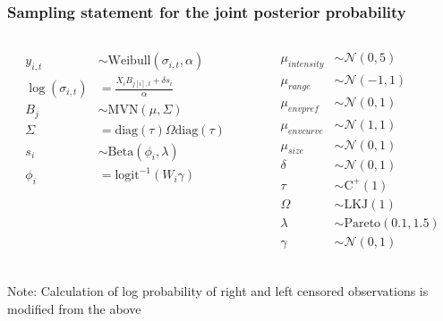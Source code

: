 \documentclass{beamer}
\begin{document}
\begin{frame}
  \frametitle{Sampling statement for the joint posterior probability}
  \begin{columns}
    \begin{column}{0.5\textwidth}
      \begin{align*}
        y_{i, t} &\sim \text{Weibull}(\sigma_{i, t}, \alpha) \\
        \log(\sigma_{i, t}) &= \frac{X_{i}B_{j[i], t} + \delta s_{i}}{\alpha} \\
        B_{j} &\sim \text{MVN}(\mu, \Sigma) \\
        \Sigma &= \text{diag}(\tau) \Omega \text{diag}(\tau) \\
        s_{i} &\sim \text{Beta}(\phi_{i}, \lambda) \\
        \phi_{i} &= \text{logit}^{-1}(W_{i}\gamma) \\
      \end{align*}
    \end{column}
    \begin{column}{0.5\textwidth}
      \begin{align*}
        \mu_{intensity} &\sim \mathcal{N}(0, 5) \\
        \mu_{range} &\sim \mathcal{N}(-1, 1) \\
        \mu_{env pref} &\sim \mathcal{N}(0, 1) \\
        \mu_{env curve} &\sim \mathcal{N}(1, 1) \\
        \mu_{size} &\sim \mathcal{N}(0, 1) \\
        \delta &\sim \mathcal{N}(0, 1) \\
        \tau &\sim \text{C}^{+}(1) \\
        \Omega &\sim \text{LKJ}(1) \\
        \lambda &\sim \text{Pareto}(0.1, 1.5) \\
        \gamma &\sim \mathcal{N}(0, 1) \\
      \end{align*}
    \end{column}
  \end{columns}

  \scriptsize{Note: Calculation of log probability of right and left censored observations is modified from the above}
\end{frame}

\end{document}

